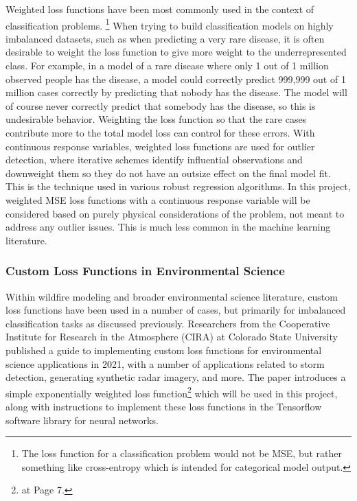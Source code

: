\documentclass[11pt]{article}%
\begin{document}
Weighted loss functions have been most commonly used in the context of classification problems. \footnote{The loss function for a classification problem would not be MSE, but rather something like cross-entropy which is intended for categorical model output.} When trying to build classification models on highly imbalanced datasets, such as when predicting a very rare disease, it is often desirable to weight the loss function to give more weight to the underrepresented class. For example, in a model of a rare disease where only 1 out of 1 million observed people has the disease, a model could correctly predict 999,999 out of 1 million cases correctly by predicting that nobody has the disease. The model will of course never correctly predict that somebody has the disease, so this is undesirable behavior. Weighting the loss function so that the rare cases contribute more to the total model loss can control for these errors. With continuous response variables, weighted loss functions are used for outlier detection, where iterative schemes identify influential observations and downweight them so they do not have an outsize effect on the final model fit. This is the technique used in various robust regression algorithms.\cite{OLeary-1990-RRC} In this project, weighted MSE loss functions with a continuous response variable will be considered based on purely physical considerations of the problem, not meant to address any outlier issues. This is much less common in the machine learning literature.

\subsubsection{Custom Loss Functions in Environmental Science}

Within wildfire modeling and broader environmental science literature, custom loss functions have been used in a number of cases, but primarily for imbalanced classification tasks as discussed previously. Researchers from the Cooperative Institute for Research in the Atmosphere (CIRA) at Colorado State University published a guide to implementing custom loss functions for environmental science applications in 2021, with a number of applications related to storm detection, generating synthetic radar imagery, and more. \cite{Ebert-2021-GCL} The paper introduces a simple exponentially weighted loss function\footnote{\cite{Ebert-2021-GCL} at Page 7.} which will be used in this project, along with instructions to implement these loss functions in the Tensorflow software library for neural networks.
\end{document}
